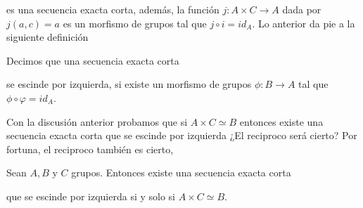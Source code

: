 \documentclass[11pt]{article}
\begin{document}
\noindent es una secuencia exacta corta, además, la función $j:A\times C\to A$ dada por $j(a,c)=a$ 
es un morfismo de grupos tal que $j\circ i=id_{A}$. Lo anterior da pie a la siguiente definición

\begin{dfn}
    Decimos que una secuencia exacta corta

    \vspace{2mm}
    \centerline{
    } \vspace{2mm}

    se escinde por izquierda, si existe un morfismo de grupos $\phi:B\to A$ tal que 
    $\phi\circ\varphi=id_{A}$.
\end{dfn}

\noindent Con la discusión anterior probamos que si $A\times C\simeq B$ entonces existe una 
secuencia exacta corta que se escinde por izquierda ¿El reciproco será cierto? Por fortuna, el
reciproco también es cierto,

\begin{lema}
    Sean $A, B$ y $C$ grupos. Entonces existe una secuencia exacta corta

    \centerline{
    } \vspace{2mm}
    que se escinde por izquierda si y solo si $A\times C\simeq B$.
\end{lema}
\end{document}
